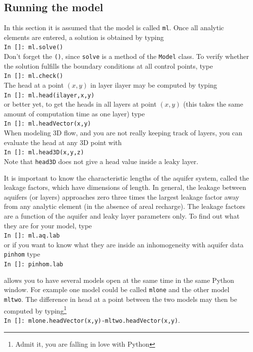 \documentclass [10pt,letterpaper] {article}
\begin{document}
\subsection{Running the model}
In this section it is assumed that the model is called {\tt ml}.
Once all analytic elements are entered, a solution is obtained by
typing
\\ {\tt In []: ml.solve()}
\\ Don't forget the {\tt ()}, since {\tt solve} is a method of the
{\tt Model} class. To
verify whether the solution fulfills the boundary conditions at all control
points, type
\\ {\tt In []: ml.check()}
\\The head at a point $(x,y)$  in layer ilayer may be computed by typing
\\ {\tt In []: ml.head(ilayer,x,y)}
\\ or better yet, to get the heads in all layers at point $(x,y)$
(this takes the same amount of computation time as one layer)
type
\\ {\tt In []: ml.headVector(x,y)}
\\When modeling 3D flow, and you are not really keeping track of layers, you can evaluate
the head at any 3D point with
\\ {\tt In []: ml.head3D(x,y,z)}
\\Note that {\tt head3D} does not give a head value inside a leaky layer.

It is important to know the characteristic lengths of the aquifer system, called the leakage factors,
which have dimensions of length.
In general, the leakage between aquifers (or layers) approaches zero three times the largest leakage
factor away from any analytic element (in the absence of areal recharge). The leakage
factors are a function of the aquifer and leaky layer parameters only. To find out what they are for
your model, type
\\ {\tt In []: ml.aq.lab}
\\ or if you want to know what they are inside an inhomogeneity with aquifer data {\tt pinhom} type
\\ {\tt In []: pinhom.lab}


\Timsp allows you to have several models open at the same time
in the same Python window. For example one model could be called {\tt mlone} and
the other model {\tt mltwo}. The difference in
head at a point between the two models may then be computed by typing\footnote{Admit it, you are falling in love
with Python}
\\ {\tt In []: mlone.headVector(x,y)-mltwo.headVector(x,y)}.
\end{document}
